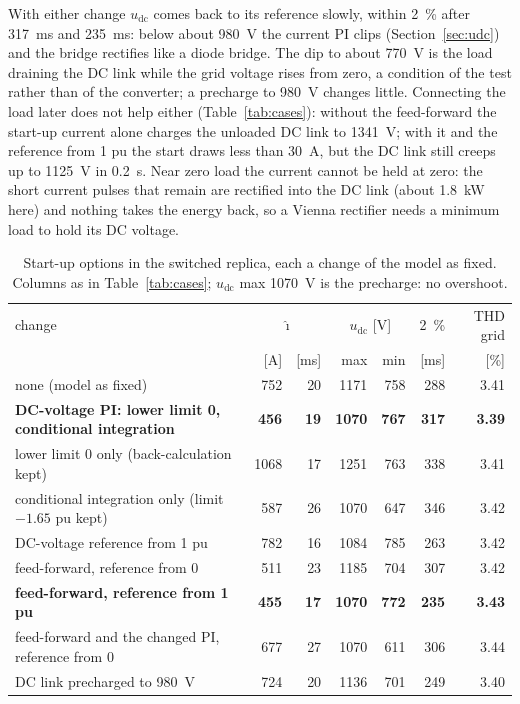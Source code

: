\documentclass[11pt,a4paper]{scrartcl}
\newcommand{\ped}[1]{_{\mathrm{#1}}}
\begin{document}
\begin{onehalfspace}
With either change $u\ped{dc}$ comes back to its reference slowly, within 2~\% after \SI{317}{\milli\second} and \SI{235}{\milli\second}: below about \SI{980}{\volt} the current PI clips (Section~\ref{sec:udc}) and the bridge rectifies like a diode bridge. The dip to about \SI{770}{\volt} is the load draining the DC link while the grid voltage rises from zero, a condition of the test rather than of the converter; a precharge to \SI{980}{\volt} changes little. Connecting the load later does not help either (Table~\ref{tab:cases}): without the feed-forward the start-up current alone charges the unloaded DC link to \SI{1341}{\volt}; with it and the reference from \num{1} pu the start draws less than \SI{30}{\ampere}, but the DC link still creeps up to \SI{1125}{\volt} in \SI{0.2}{\second}. Near zero load the current cannot be held at zero: the short current pulses that remain are rectified into the DC link (about \SI{1.8}{\kilo\watt} here) and nothing takes the energy back, so a Vienna rectifier needs a minimum load to hold its DC voltage.

\begin{table}[htbp]
	\centering
	\caption{Start-up options in the switched replica, each a change of the model as fixed. Columns as in Table~\ref{tab:cases}; $u\ped{dc}$ max \SI{1070}{\volt} is the precharge: no overshoot.}
	\label{tab:startopt}
	\footnotesize
	\begin{tabular}{@{} l r r r r r r @{}}
		\toprule
		change & \multicolumn{2}{c}{$\hat\imath$} & \multicolumn{2}{c}{$u\ped{dc}$ [V]} & 2~\% & THD grid \\
		 & [A] & [ms] & max & min & [ms] & [\%] \\
		\midrule
		none (model as fixed) & 752 & 20 & 1171 & 758 & 288 & 3.41 \\
		\textbf{DC-voltage PI: lower limit 0, conditional integration} & \textbf{456} & \textbf{19} & \textbf{1070} & \textbf{767} & \textbf{317} & \textbf{3.39} \\
		\quad lower limit 0 only (back-calculation kept) & 1068 & 17 & 1251 & 763 & 338 & 3.41 \\
		\quad conditional integration only (limit $-1.65$ pu kept) & 587 & 26 & 1070 & 647 & 346 & 3.42 \\
		DC-voltage reference from 1 pu & 782 & 16 & 1084 & 785 & 263 & 3.42 \\
		feed-forward, reference from 0 & 511 & 23 & 1185 & 704 & 307 & 3.42 \\
		\textbf{feed-forward, reference from 1 pu} & \textbf{455} & \textbf{17} & \textbf{1070} & \textbf{772} & \textbf{235} & \textbf{3.43} \\
		feed-forward and the changed PI, reference from 0 & 677 & 27 & 1070 & 611 & 306 & 3.44 \\
		DC link precharged to \SI{980}{\volt} & 724 & 20 & 1136 & 701 & 249 & 3.40 \\
		\bottomrule
	\end{tabular}
\end{table}


\end{onehalfspace}
\end{document}
